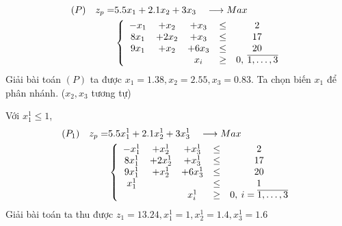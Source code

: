 \documentclass[12pt,a4paper]{report}
\begin{document}
    \begin{equation*}
    \begin{split}
    (P) \quad z_p= & 5.5x_1 + 2.1x_2 + 3x_3 \quad \longrightarrow Max \\
    & \left\{\begin{array} {ccccc}
     -x_1 &+ x_2 &+ x_3 &\leq& 2 \\
     8x_1 &+ 2x_2 &+ x_3&\leq& 17 \\
     9x_1 &+ x_2 &+ 6x_3 &\leq& 20 \\
    &&x_i &\geq& 0 , \: \overline{\rm 1, \ldots ,3} \\
    \end{array}\right. \\
    \end{split}
    \end{equation*}
    Giải bài toán $(P)$ ta được $x_1=1.38, x_2=2.55, x_3=0.83$. Ta chọn biến $x_1$ để phân nhánh. ($x_2, x_3$ tương tự)
    
    Với $x^1_1 \leq 1$, \\ 
    \begin{equation*}
    \begin{split}
      (P_1) \quad z_p= & 5.5x^1_1 + 2.1x^1_2 + 3x^1_3 \quad \longrightarrow Max \\
      & \left\{\begin{array} {ccccc}
       -x^1_1 &+ x^1_2 &+ x^1_3 &\leq& 2 \\
       8x^1_1 &+ 2x^1_2 &+ x^1_3&\leq& 17 \\
       9x^1_1 &+ x^1_2 &+ 6x^1_3 &\leq& 20 \\
       x^1_1 &&&\leq &1 \\
      &&x^1_i &\geq& 0 , \: i=\overline{\rm 1, \ldots ,3} \\
      \end{array}\right. \\
    \end{split}
    \end{equation*}
    Giải bài toán ta thu được $z_1=13.24, x^1_1=1, x^1_2=1.4, x^1_3=1.6$
    
    
    
\end{document}
